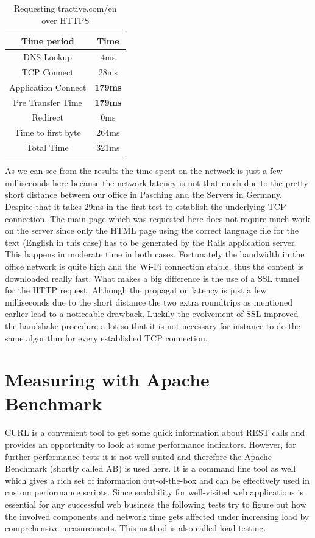 \begin{table}[h]
\begin{center}
\begin{tabular}{| c | c |}
    \hline
    Time period & Time  \\ \hline
    DNS Lookup & 4ms  \\ \hline
    TCP Connect & 28ms \\ \hline
    Application Connect & \textbf{179ms} \\ \hline 
    Pre Transfer Time & \textbf{179ms} \\ \hline
    Redirect & 0ms\\ \hline
    Time to first byte & 264ms \\ \hline
    Total Time & 321ms \\
    \hline
\end{tabular}
\caption{Requesting tractive.com/en over HTTPS}
\end{center}
\end{table}

As we can see from the results the time spent on the network is just a few milliseconds here because the network latency is not that much due to the pretty short distance between our office in Pasching and the Servers in Germany. Despite that it takes 29ms in the first test to establish the underlying TCP connection. The main page which was requested here does not require much work on the server since only the HTML page using the correct language file for the text (English in this case) has to be generated by the Rails application server. This happens in moderate time in both cases. Fortunately the bandwidth in the office network is quite high and the Wi-Fi connection stable, thus the content is downloaded really fast. What makes a big difference is the use of a SSL tunnel for the HTTP request. Although the propagation latency is just a few milliseconds due to the short distance the two extra roundtrips as mentioned earlier lead to a noticeable drawback. Luckily the evolvement of SSL improved the handshake procedure a lot so that it is not necessary for instance to do the same algorithm for every established TCP connection.

\section{Measuring with Apache Benchmark}

CURL is a convenient tool to get some quick information about REST calls and provides an opportunity to look at some performance indicators. However, for further performance tests it is not well suited and therefore the Apache Benchmark (shortly called AB) is used here. It is a command line tool as well which gives a rich set of information out-of-the-box and can be effectively used in custom performance scripts. Since scalability for well-visited web applications is essential for any successful web business the following tests try to figure out how the involved components and network time gets affected under increasing load by comprehensive measurements. This method is also called load testing.

